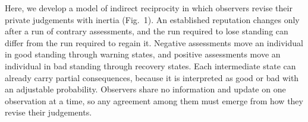 Here, we develop a model of indirect reciprocity in which observers revise their private judgements with inertia (Fig.~1). An established reputation changes only after a run of contrary assessments, and the run required to lose standing can differ from the run required to regain it. Negative assessments move an individual in good standing through warning states, and positive assessments move an individual in bad standing through recovery states. Each intermediate state can already carry partial consequences, because it is interpreted as good or bad with an adjustable probability. Observers share no information and update on one observation at a time, so any agreement among them must emerge from how they revise their judgements.
